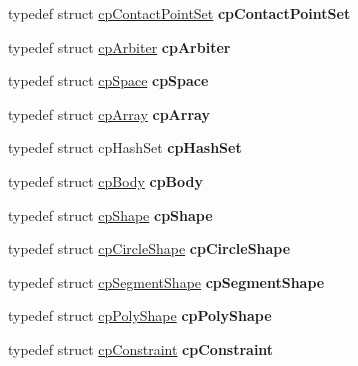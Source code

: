 \begin{DoxyCompactItemize}
typedef struct \hyperlink{structcpContactPointSet}{cp\+Contact\+Point\+Set} {\bfseries cp\+Contact\+Point\+Set}
\item 
\mbox{\label{group__misc_ga771a9d6a062a6097f0e6bb1b2682e93f}} 
typedef struct \hyperlink{structcpArbiter}{cp\+Arbiter} {\bfseries cp\+Arbiter}
\item 
\mbox{\label{group__misc_ga8838f85d2e2ba627fc4c9208fb1a4682}} 
typedef struct \hyperlink{structcpSpace}{cp\+Space} {\bfseries cp\+Space}
\item 
\mbox{\label{group__misc_ga6b357f2c1d3fedc78e2c7aaa5186d566}} 
typedef struct \hyperlink{structcpArray}{cp\+Array} {\bfseries cp\+Array}
\item 
\mbox{\label{group__misc_ga0c80056192ac0574141a88de933b16b3}} 
typedef struct cp\+Hash\+Set {\bfseries cp\+Hash\+Set}
\item 
\mbox{\label{group__misc_ga89830b081a94b2500cc1ca31c43ac006}} 
typedef struct \hyperlink{structcpBody}{cp\+Body} {\bfseries cp\+Body}
\item 
\mbox{\label{group__misc_ga16375f8bc5b219cde7560b23443b3a95}} 
typedef struct \hyperlink{structcpShape}{cp\+Shape} {\bfseries cp\+Shape}
\item 
\mbox{\label{group__misc_gadc0a8c50b9b7b6cdf205f1e446d77b23}} 
typedef struct \hyperlink{structcpCircleShape}{cp\+Circle\+Shape} {\bfseries cp\+Circle\+Shape}
\item 
\mbox{\label{group__misc_ga75717b3e5384ae67f7b5a7dd9d54c50f}} 
typedef struct \hyperlink{structcpSegmentShape}{cp\+Segment\+Shape} {\bfseries cp\+Segment\+Shape}
\item 
\mbox{\label{group__misc_gac0977850752deeb7bd3bae3e6e67b088}} 
typedef struct \hyperlink{structcpPolyShape}{cp\+Poly\+Shape} {\bfseries cp\+Poly\+Shape}
\item 
\mbox{\label{group__misc_gabdb40b2f09deac0d0e05605be0701be3}} 
typedef struct \hyperlink{structcpConstraint}{cp\+Constraint} {\bfseries cp\+Constraint}

\end{DoxyCompactItemize}
